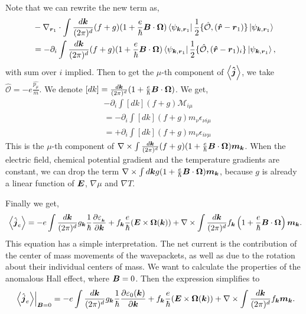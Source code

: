 \documentclass{report}
\renewcommand\vec[1]{\ensuremath\boldsymbol{#1}} %
\begin{document}
Note that we can rewrite the new term as,
$$
\begin{aligned}
&-\nabla_{\vec{r}_1} \cdot \int \frac{d\vec{k}}{(2\pi)^d} (f+g) (1+\frac{e}{\hbar} \vec{B}\cdot\vec{\Omega})
\bra{\psi_{\vec{k},\vec{r}_1}} \frac{1}{2}\{\hat{\mathcal{O}}, (\vec{\hat{r}} - \vec{r}_1)\} \ket{\psi_{\vec{k},\vec{r}_1}}\\ &= -\partial_i \int \frac{d\vec{k}}{(2\pi)^d} (f+g) (1+\frac{e}{\hbar} \vec{B}\cdot\vec{\Omega})
\bra{\psi_{\vec{k},\vec{r}_1}} \frac{1}{2}\{\hat{\mathcal{O}}, (\vec{\hat{r}} - \vec{r}_1)_i\} \ket{\psi_{\vec{k},\vec{r}_1}},
\end{aligned}$$ with sum over $i$ implied. Then to get the $\mu$-th component of $\expval{\vec{\hat{j}}}$, we take $\mathcal{\hat{O}} = -e\frac{\hat{{p}_\mu}}{m}$. We denote $[dk] = \frac{d\vec{k}}{(2\pi)^d} (1+\frac{e}{\hbar} \vec{B}\cdot\vec{\Omega})$. We get,
$$\begin{aligned}
	&-\partial_i \int [dk] (f+g) \mathcal{M}_{i \mu}\\
&= -\partial_i \int [dk] (f+g) m_{\nu} \epsilon_{\nu i \mu}\\
&= +\partial_i \int [dk] (f+g) m_{\nu} \epsilon_{ i \nu \mu}
\end{aligned}
$$
This is the $\mu$-th component of $\nabla \times \int \frac{d\vec{k}}{(2\pi)^d} (f+g) (1+\frac{e}{\hbar} \vec{B}\cdot\vec{\Omega}) \vec{m}_{\vec{k}}$. When the electric field, chemical potential gradient and the temperature gradients are constant, we can drop the term $\nabla \times \int d\vec{k} g (1+\frac{e}{\hbar} \vec{B}\cdot\vec{\Omega}) \vec{m}_{\vec{k}}$, because $g$ is already a linear function of $\vec{E}$, $\nabla \mu$ and $\nabla T$.

Finally we get,
\begin{equation}~\label{Eq:electric-current-simplified-magnetization-included}
	\expval{\hat{\vec{j}}_e} = -e \int \frac{d\vec{k}}{(2\pi)^d} {g}_{\vec{k}} \frac{1}{\hbar} \frac{\partial \varepsilon_{_{\vec{k}}}}{\partial \vec{k}} + {f}_{\vec{k}} \frac{e}{\hbar} (\vec{E} \times \vec{\Omega}(\vec{k})) + \nabla \times \int \frac{d\vec{k}}{(2\pi)^d} f_{\vec{k}} \left(1+\frac{e}{\hbar} \vec{B}\cdot\vec{\Omega}\right) \vec{m}_{\vec{k}}.
\end{equation}
This equation has a simple interpretation. The net current is the contribution of the center of mass movements of the wavepackets, as well as due to the rotation about their individual centers of mass.
We want to calculate the properties of the anomalous Hall effect, where $\vec{B} = 0$. Then the expression simplifies to \begin{equation}~\label{Eq:electric-current-simplified-magnetization-included-zeromagfield}
	\left. \expval{\hat{\vec{j}}_e}\right|_{\vec{B} = 0} 
	= -e \int \frac{d\vec{k}}{(2\pi)^d} {g}_{\vec{k}} \frac{1}{\hbar} \frac{\partial \varepsilon_0({{\vec{k}}})}{\partial \vec{k}} + {f}_{\vec{k}} \frac{e}{\hbar} (\vec{E} \times \vec{\Omega}(\vec{k})) + \nabla \times \int \frac{d\vec{k}}{(2\pi)^d} f_{\vec{k}}  \vec{m}_{\vec{k}}.
\end{equation}
\end{document}
